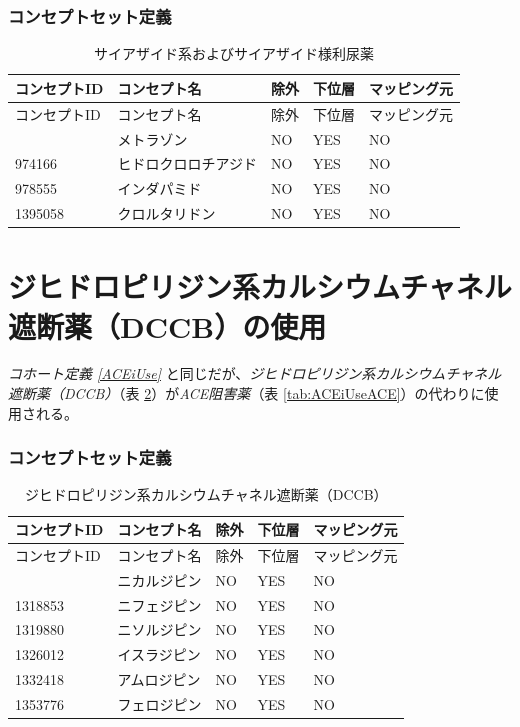 \documentclass[
  11pt]{book}
\theoremstyle{definition}
\theoremstyle{definition}
\theoremstyle{definition}
\theoremstyle{definition}
\theoremstyle{remark}
\begin{document}
\subsubsection*{コンセプトセット定義}\label{ux30b3ux30f3ux30bbux30d7ux30c8ux30bbux30c3ux30c8ux5b9aux7fa9-6}

\begin{longtable}[]{@{}lllll@{}}
\caption{\label{tab:THZUseTHZ} サイアザイド系およびサイアザイド様利尿薬}\tabularnewline
\toprule\noalign{}
コンセプトID & コンセプト名 & 除外 & 下位層 & マッピング元 \\
\midrule\noalign{}
\endfirsthead
\toprule\noalign{}
コンセプトID & コンセプト名 & 除外 & 下位層 & マッピング元 \\
\midrule\noalign{}
\endhead
\bottomrule\noalign{}
\endlastfoot
907013 & メトラゾン & NO & YES & NO \\
974166 & ヒドロクロロチアジド & NO & YES & NO \\
978555 & インダパミド & NO & YES & NO \\
1395058 & クロルタリドン & NO & YES & NO \\
\end{longtable}

\section{ジヒドロピリジン系カルシウムチャネル遮断薬（DCCB）の使用}\label{dCCBUse}

\emph{コホート定義 \ref{ACEiUse}} と同じだが、\emph{ジヒドロピリジン系カルシウムチャネル遮断薬（DCCB）}（表 \ref{tab:dCCBUsedCBB}）が\emph{ACE阻害薬}（表 \ref{tab:ACEiUseACE}）の代わりに使用される。

\subsubsection*{コンセプトセット定義}\label{ux30b3ux30f3ux30bbux30d7ux30c8ux30bbux30c3ux30c8ux5b9aux7fa9-7}

\begin{longtable}[]{@{}lllll@{}}
\caption{\label{tab:dCCBUsedCBB} ジヒドロピリジン系カルシウムチャネル遮断薬（DCCB）}\tabularnewline
\toprule\noalign{}
コンセプトID & コンセプト名 & 除外 & 下位層 & マッピング元 \\
\midrule\noalign{}
\endfirsthead
\toprule\noalign{}
コンセプトID & コンセプト名 & 除外 & 下位層 & マッピング元 \\
\midrule\noalign{}
\endhead
\bottomrule\noalign{}
\endlastfoot
1318137 & ニカルジピン & NO & YES & NO \\
1318853 & ニフェジピン & NO & YES & NO \\
1319880 & ニソルジピン & NO & YES & NO \\
1326012 & イスラジピン & NO & YES & NO \\
1332418 & アムロジピン & NO & YES & NO \\
1353776 & フェロジピン & NO & YES & NO \\
\end{longtable}
\end{document}
